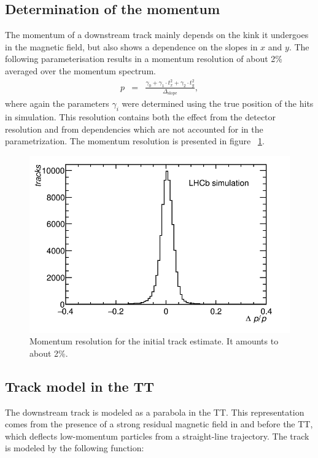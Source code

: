 \subsection{Determination of the momentum}
The momentum of a downstream track mainly depends on the kink it undergoes in
the magnetic field, but also shows a dependence on the slopes in $x$ and $y$.
The following parameterisation results in a momentum resolution of about 2\%
averaged over the momentum spectrum.
\begin{eqnarray}
\label{eq:momentum}
p & = & \frac{ \gamma_{0} + \gamma_{1} \cdot t_{x}^{2} + \gamma_{2} \cdot t_{y}^{2} }{ \Delta_{\text{slope}} },
\end{eqnarray}
where again the parameters $\gamma_{i}$ were determined using the true position
of the hits in simulation. This resolution contains both the effect from the detector 
resolution and from dependencies which are not accounted for in the parametrization. 
The momentum resolution is presented in figure ~\ref{fig:momReso}.
\begin{figure}[!htbp]
 \begin{center}
   \includegraphics[width=0.8\linewidth]{figures/momReso.png}
    \caption{Momentum resolution for the initial track estimate. It amounts to about 2\%.
     \label{fig:momReso}}
 \end{center}
\end{figure}


\subsection{Track model in the TT}
\label{sec:trackModelTT}
The downstream track is modeled as a parabola in the TT. This representation comes from the presence of a strong residual magnetic field in and before the TT, which deflects low-momentum particles from a straight-line trajectory. 
The track is modeled by the following function:

